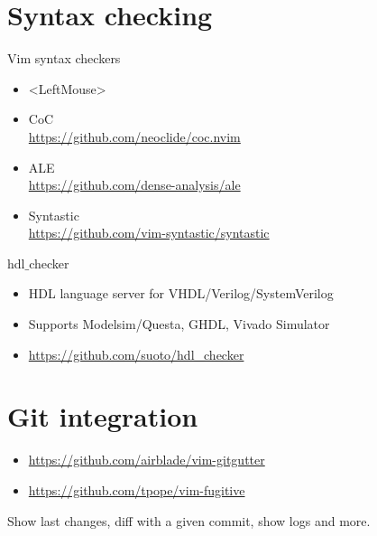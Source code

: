 \documentclass[aspectratio=169]{beamer}
\begin{document}
\section*{Syntax checking}
\begin{frame}{\secname}

  \begin{block}{Vim syntax checkers}
  \begin{itemize}
    \item <LeftMouse>
    \item CoC  \\ \url{https://github.com/neoclide/coc.nvim} 
    \item ALE \\ \url{https://github.com/dense-analysis/ale}
    \item Syntastic \\ \url{https://github.com/vim-syntastic/syntastic}
  \end{itemize}
  \end{block}

  \begin{block}{hdl$\_$checker}
    \begin{itemize}
     \item HDL language server  for VHDL/Verilog/SystemVerilog
     \item Supports Modelsim/Questa, GHDL, Vivado Simulator
     \item \url{https://github.com/suoto/hdl_checker}
    \end{itemize}
    
  \end{block}
    
\end{frame}

\section*{Git integration}
\begin{frame}{\secname}
  \begin{itemize}
    \item \url{https://github.com/airblade/vim-gitgutter}
    \item \url{https://github.com/tpope/vim-fugitive}
  \end{itemize}
  Show last changes, diff with a given commit, show logs and more.
    
\end{frame}
\end{document}

